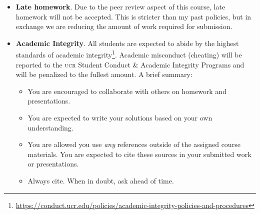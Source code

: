\documentclass[12pt]{article}
\numberwithin{equation}{section}    %
\begin{document}
\begin{itemize}
	\item \textbf{Late homework}. Due to the peer review aspect of this course, late homework will not be accepted. This is stricter than my past policies, but in exchange we are reducing the amount of work required for submission.
	\item \textbf{Academic Integrity}. All students are expected to abide by the highest standards of academic integrity\footnote{\url{https://conduct.ucr.edu/policies/academic-integrity-policies-and-procedures}}. Academic misconduct (cheating) will be reported to the \textsc{ucr} Student Conduct \& Academic Integrity Programs and will be penalized to the fullest amount. A brief summary:
	\begin{itemize}
		\item You are encouraged to collaborate with others on homework and presentations. 
		\item You are expected to write your solutions based on your own understanding.
		\item You are allowed you use \emph{any} references outside of the assigned course materials. You are expected to cite these sources in your submitted work or presentations.
		\item Always cite. When in doubt, ask ahead of time.
	\end{itemize}

\end{itemize}
\end{document}
